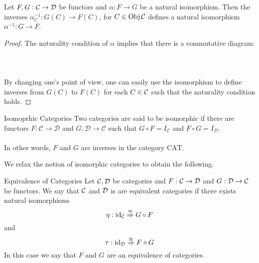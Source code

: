 \documentclass[a4paper]{article}
\begin{document}
\begin{lmm}{}{} Let $F,G:\mathcal{C}\to\mathcal{D}$ be functors and $\alpha:F\to G$ be a natural isomorphism. Then the inverses $\alpha^{-1}_C:G(C)\to F(C)$, for $C\in\operatorname{Obj}\mathcal{C}$ defines a natural isomorphism $\alpha^{-1}:G\to F$. \tcbline
\begin{proof}
The naturality condition of $\alpha$ implies that there is a commutative diagram: \\~\\
\\~\\
By changing one's point of view, one can easily use the isomorphism to define inverses from $G(C)$ to $F(C)$ for each $C\in\mathcal{C}$ such that the naturality condition holds. 
\end{proof}
\end{lmm}

\begin{defn}{Isomoprhic Categories}{} Two categories are said to be isomorphic if there are functors $F:\mathcal{C}\to\mathcal{D}$ and $G:\mathcal{D}\to\mathcal{C}$ such that $G\circ F=I_\mathcal{C}$ and $F\circ G=I_\mathcal{D}$. \\~\\
In other words, $F$ and $G$ are inverses in the category $\text{CAT}$. 
\end{defn}

We relax the notion of isomorphic categories to obtain the following. 

\begin{defn}{Equivalence of Categories}{} Let $\mathcal{C},\mathcal{D}$ be categories and $F:\mathcal{C}\to\mathcal{D}$ and $G:\mathcal{D}\to\mathcal{C}$ be functors. We say that $\mathcal{C}$ and $\mathcal{D}$ is are equivalent categories if there exists natural isomorphisms $$
\eta:\text{id}_{\mathcal{C}}\overset{\cong}{\Rightarrow}G\circ F$$ and $$
\tau:\text{id}_{\mathcal{D}}\overset{\cong}{\Rightarrow}F\circ G$$
In this case we say that $F$ and $G$ are an equivalence of categories. 
\end{defn}
\end{document}
